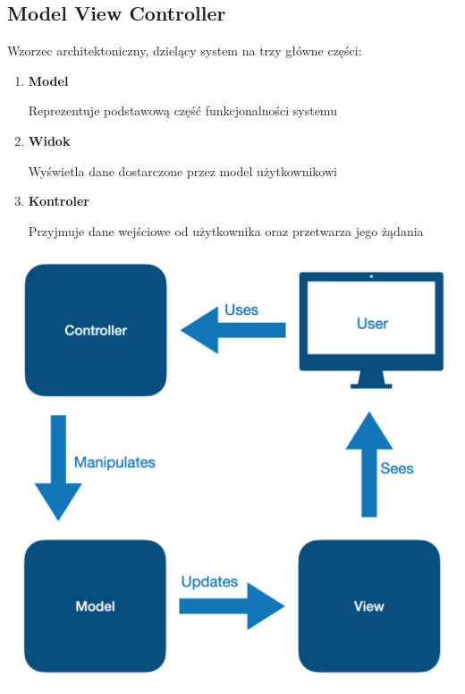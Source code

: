 \documentclass[12pt]{article}
\begin{document}
        \subsection{Model View Controller}

            Wzorzec architektoniczny, dzielący system na trzy główne części:
            \begin{enumerate}
                \item \textbf{Model}
                    
                    Reprezentuje podstawową część funkcjonalności systemu

                \item \textbf{Widok}

                    Wyświetla dane dostarczone przez model użytkownikowi

                \item \textbf{Kontroler}
                    
                    Przyjmuje dane wejściowe od użytkownika oraz przetwarza jego żądania

            \end{enumerate}

            \begin{center}
                \includegraphics[scale=0.30]{patterns/mvc.png}
            \end{center}
\end{document}
